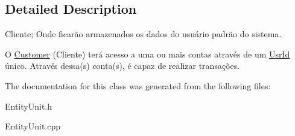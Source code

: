 \subsection{Detailed Description}
Cliente; Onde ficarão armazenados os dados do usuário padrão do sistema. 

O \hyperlink{classCustomer}{Customer} (Cliente) terá acesso a uma ou mais contas através de um \hyperlink{classUsrId}{Usr\-Id} único. Através dessa(s) conta(s), é capaz de realizar transações. 

The documentation for this class was generated from the following files\-:\begin{DoxyCompactItemize}
\item 
Entity\-Unit.\-h\item 
Entity\-Unit.\-cpp\end{DoxyCompactItemize}
